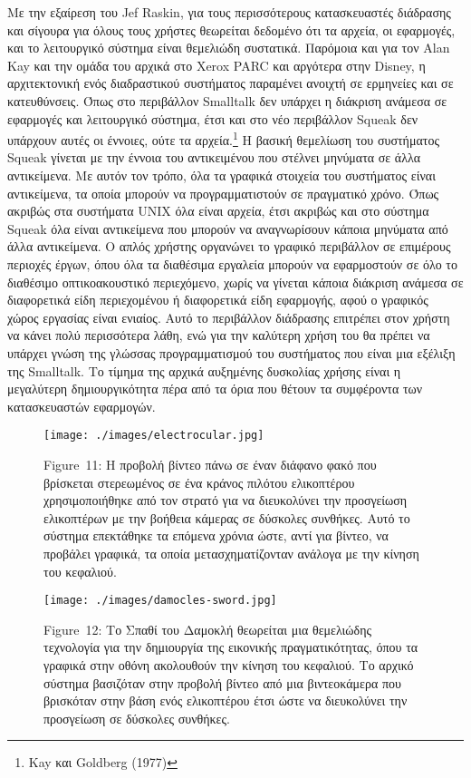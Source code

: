 \documentclass[
]{article}
\begin{document}
Με την εξαίρεση του Jef Raskin, για τους περισσότερους κατασκευαστές
διάδρασης και σίγουρα για όλους τους χρήστες θεωρείται δεδομένο ότι τα
αρχεία, οι εφαρμογές, και το λειτουργικό σύστημα είναι θεμελιώδη
συστατικά. Παρόμοια και για τον Alan Kay και την ομάδα του αρχικά στο
Xerox PARC και αργότερα στην Disney, η αρχιτεκτονική ενός διαδραστικού
συστήματος παραμένει ανοιχτή σε ερμηνείες και σε κατευθύνσεις. Όπως στο
περιβάλλον Smalltalk δεν υπάρχει η διάκριση ανάμεσα σε εφαρμογές και
λειτουργικό σύστημα, έτσι και στο νέο περιβάλλον Squeak δεν υπάρχουν
αυτές οι έννοιες, ούτε τα αρχεία.\footnote{Kay και Goldberg (1977)} Η
βασική θεμελίωση του συστήματος Squeak γίνεται με την έννοια του
αντικειμένου που στέλνει μηνύματα σε άλλα αντικείμενα. Με αυτόν τον
τρόπο, όλα τα γραφικά στοιχεία του συστήματος είναι αντικείμενα, τα
οποία μπορούν να προγραμματιστούν σε πραγματικό χρόνο. Όπως ακριβώς στα
συστήματα UNIX όλα είναι αρχεία, έτσι ακριβώς και στο σύστημα Squeak όλα
είναι αντικείμενα που μπορούν να αναγνωρίσουν κάποια μηνύματα από άλλα
αντικείμενα. Ο απλός χρήστης οργανώνει το γραφικό περιβάλλον σε
επιμέρους περιοχές έργων, όπου όλα τα διαθέσιμα εργαλεία μπορούν να
εφαρμοστούν σε όλο το διαθέσιμο οπτικοακουστικό περιεχόμενο, χωρίς να
γίνεται κάποια διάκριση ανάμεσα σε διαφορετικά είδη περιεχομένου ή
διαφορετικά είδη εφαρμογής, αφού ο γραφικός χώρος εργασίας είναι
ενιαίος. Αυτό το περιβάλλον διάδρασης επιτρέπει στον χρήστη να κάνει
πολύ περισσότερα λάθη, ενώ για την καλύτερη χρήση του θα πρέπει να
υπάρχει γνώση της γλώσσας προγραμματισμού του συστήματος που είναι μια
εξέλιξη της Smalltalk. Το τίμημα της αρχικά αυξημένης δυσκολίας χρήσης
είναι η μεγαλύτερη δημιουργικότητα πέρα από τα όρια που θέτουν τα
συμφέροντα των κατασκευαστών εφαρμογών.

\leavevmode{}%
\begin{figure}
\hypertarget{fig:electrocular}{%
\centering
\texttt{[image: ./images/electrocular.jpg]}
\caption{Figure~11: Η προβολή βίντεο πάνω σε έναν διάφανο φακό που
βρίσκεται στερεωμένος σε ένα κράνος πιλότου ελικοπτέρου χρησιμοποιήθηκε
από τον στρατό για να διευκολύνει την προσγείωση ελικοπτέρων με την
βοήθεια κάμερας σε δύσκολες συνθήκες. Αυτό το σύστημα επεκτάθηκε τα
επόμενα χρόνια ώστε, αντί για βίντεο, να προβάλει γραφικά, τα οποία
μετασχηματίζονταν ανάλογα με την κίνηση του
κεφαλιού.}\label{fig:electrocular}
}
\end{figure}

\leavevmode{}%
\begin{figure}
\hypertarget{fig:damocles-sword}{%
\centering
\texttt{[image: ./images/damocles-sword.jpg]}
\caption{Figure~12: Tο Σπαθί του Δαμοκλή θεωρείται μια θεμελιώδης
τεχνολογία για την δημιουργία της εικονικής πραγματικότητας, όπου τα
γραφικά στην οθόνη ακολουθούν την κίνηση του κεφαλιού. Το αρχικό σύστημα
βασιζόταν στην προβολή βίντεο από μια βιντεοκάμερα που βρισκόταν στην
βάση ενός ελικοπτέρου έτσι ώστε να διευκολύνει την προσγείωση σε
δύσκολες συνθήκες.}\label{fig:damocles-sword}
}
\end{figure}
\end{document}
